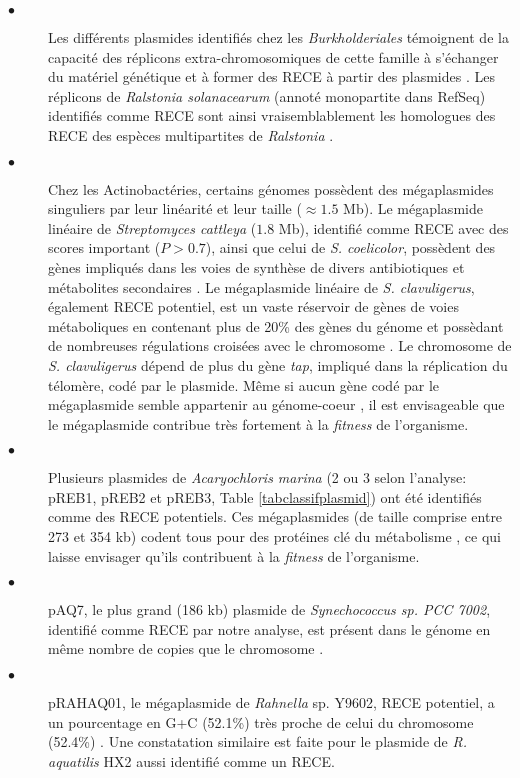 \begin{description}
	\item[$\bullet$] Les différents plasmides identifiés chez les \textit{Burkholderiales} témoignent de la capacité des réplicons extra-chromosomiques de cette famille à s'échanger du matériel génétique \citep{maida2014origin} et à former des RECE à partir des plasmides \citep{Passot2012}. Les réplicons de \textit{Ralstonia solanacearum} (annoté monopartite dans RefSeq) identifiés comme RECE sont ainsi vraisemblablement les homologues des RECE des espèces multipartites de \textit{Ralstonia} .
	\item[$\bullet$] Chez les Actinobactéries, certains génomes possèdent des mégaplasmides singuliers par leur linéarité et leur taille ($\approx 1.5$ Mb). Le mégaplasmide linéaire de \textit{Streptomyces cattleya} ($1.8$ Mb), identifié comme RECE avec des scores important ($P>0.7$), ainsi que celui de \textit{S. coelicolor}, possèdent des gènes impliqués dans les voies de synthèse de divers antibiotiques et métabolites secondaires \citep{o2009extracellular,barbe2011complete}. Le mégaplasmide linéaire de \textit{S. clavuligerus}, également RECE potentiel, est un vaste réservoir de gènes de voies métaboliques en contenant plus de 20\% des gènes du génome et possèdant de nombreuses régulations croisées avec le chromosome \citep{medema2010sequence}. Le chromosome de \textit{S. clavuligerus} dépend de plus du gène \textit{tap}, impliqué dans la réplication du télomère, codé par le plasmide. Même si aucun gène codé par le mégaplasmide semble appartenir au génome-coeur \citep{medema2010sequence}, il est envisageable que le mégaplasmide contribue très fortement à la \textit{fitness} de l'organisme. 
	\item[$\bullet$] Plusieurs plasmides de \textit{Acaryochloris marina} (2 ou 3 selon l'analyse: pREB1, pREB2 et pREB3, Table \ref{tabclassifplasmid}) ont été identifiés comme des RECE potentiels. Ces mégaplasmides (de taille comprise entre 273 et 354 kb) codent tous pour des protéines clé du métabolisme \citep{swingley2008niche}, ce qui laisse envisager qu'ils contribuent à la \textit{fitness} de l'organisme.
	\item[$\bullet$] pAQ7, le plus grand (186 kb) plasmide de \textit{Synechococcus sp. PCC 7002}, identifié comme RECE par notre analyse, est présent dans le génome en même nombre de copies que le chromosome \citep{xu2010synechococcus}.
	 \item[$\bullet$] pRAHAQ01, le mégaplasmide de \textit{Rahnella}  sp. Y9602, RECE potentiel, a un pourcentage en G+C (52.1\%) très proche de celui du chromosome (52.4\%) \citep{martinez2012complete}. Une constatation similaire est faite pour le plasmide de \textit{R. aquatilis} HX2 aussi identifié comme un RECE.

\end{description}
